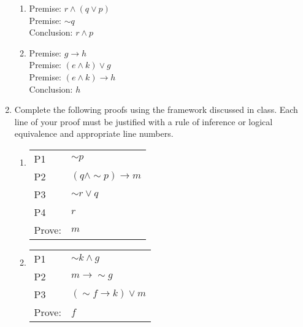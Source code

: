 \documentclass[12pt, letterpaper]{report}
\newcommand{\nott}{{\sim}}
\begin{document}
\begin{enumerate}
\begin{enumerate}
		\item 
		Premise:  $r \land (q \lor p)$ \\
		Premise:  $\nott q$ \\
		Conclusion: $r \land p$ \\
		
		\item 
		Premise: $g \to h$\\
		Premise: $(e \land k) \lor g$ \\
		Premise: $(e \land k) \to h$ \\
		Conclusion: $h$
	\end{enumerate}

\newpage
	\item Complete the following proofs using the framework discussed in class.  Each line
	of your proof must be justified with a rule of inference or logical equivalence and appropriate line numbers.
	
	\begin{enumerate}
		\item
			\begin{tabular}[t]{ll}
			P1 & $\nott p$ \\ 
			P2 & $(q \land \nott p) \to m$ \\
			P3 & $\nott r \lor q$ \\ 
			P4 & $r$ \\ \hline
			Prove: & $m$
		\end{tabular}
		
		\item
			\begin{tabular}[t]{ll}
			P1 & $\nott k \land g$ \\ 
			P2 & $m \to \nott g$ \\
			P3 & $(\nott f \to k) \lor m$ \\ \hline
			Prove: & $f$
		\end{tabular}
	\end{enumerate}

\end{enumerate}
\end{document}
